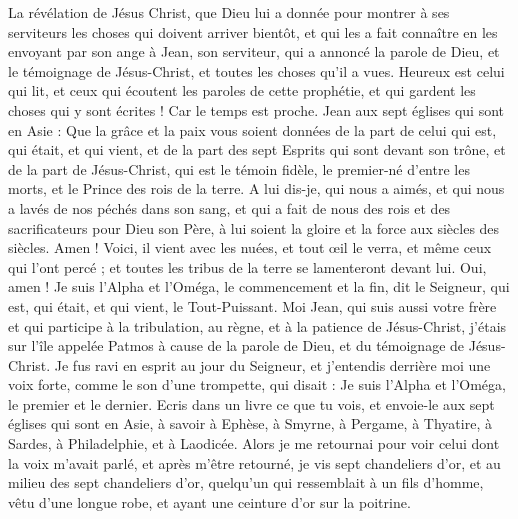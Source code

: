 \begin{multicols}{2}
\VerseOne{}La révélation de Jésus Christ, que Dieu lui a donnée pour montrer à ses serviteurs les choses qui doivent arriver bientôt, et qui les a fait connaître en les envoyant par son ange à Jean, son serviteur,
qui a annoncé la parole de Dieu, et le témoignage de Jésus-Christ, et toutes les choses qu'il a vues.
Heureux est celui qui lit, et ceux qui écoutent les paroles de cette prophétie, et qui gardent les choses qui y sont écrites ! Car le temps est proche.
Jean aux sept églises qui sont en Asie : Que la grâce et la paix vous soient données de la part de celui qui est, qui était, et qui vient, et de la part des sept Esprits qui sont devant son trône,
et de la part de Jésus-Christ, qui est le témoin fidèle, le premier-né d'entre les morts, et le Prince des rois de la terre.
A lui dis-je, qui nous a aimés, et qui nous a lavés de nos péchés dans son sang, et qui a fait de nous des rois et des sacrificateurs pour Dieu son Père, à lui soient la gloire et la force aux siècles des siècles. Amen !
Voici, il vient avec les nuées, et tout œil le verra, et même ceux qui l'ont percé ; et toutes les tribus de la terre se lamenteront devant lui. Oui, amen !
Je suis l'Alpha et l'Oméga, le commencement et la fin, dit le Seigneur, qui est, qui était, et qui vient, le Tout-Puissant.
Moi Jean, qui suis aussi votre frère et qui participe à la tribulation, au règne, et à la patience de Jésus-Christ, j'étais sur l'île appelée Patmos à cause de la parole de Dieu, et du témoignage de Jésus-Christ.
Je fus ravi en esprit au jour du Seigneur, et j'entendis derrière moi une voix forte, comme le son d'une trompette,
qui disait : Je suis l'Alpha et l'Oméga, le premier et le dernier. Ecris dans un livre ce que tu vois, et envoie-le aux sept églises qui sont en Asie, à savoir à Ephèse, à Smyrne, à Pergame, à Thyatire, à Sardes, à Philadelphie, et à Laodicée.
Alors je me retournai pour voir celui dont la voix m'avait parlé, et après m'être retourné, je vis sept chandeliers d'or,
et au milieu des sept chandeliers d'or, quelqu'un qui ressemblait à un fils d'homme, vêtu d'une longue robe, et ayant une ceinture d'or sur la poitrine.

\end{multicols}
